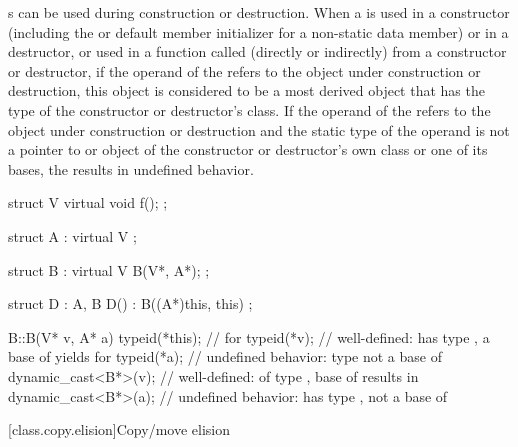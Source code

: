 \pnum
{}%
%
%
%
s can be used during construction
or destruction. When a
is used in a constructor (including the
 or default member initializer
for a non-static data member)
or in a destructor, or used in a function called (directly or indirectly) from
a constructor or destructor, if the operand of the
refers to the object under construction or destruction, this object is
considered to be a most derived object that has the type of the constructor or
destructor's class.
If the operand of the
refers to the object under construction or destruction and the static type of
the operand is not a pointer to or object of the constructor or destructor's
own class or one of its bases, the
results in undefined behavior.
\begin{example}
\begin{codeblock}
struct V {
  virtual void f();
};

struct A : virtual V { };

struct B : virtual V {
  B(V*, A*);
};

struct D : A, B {
  D() : B((A*)this, this) { }
};

B::B(V* v, A* a) {
  typeid(*this);                //  for 
  typeid(*v);                   // well-defined:  has type , a base of  yields  for 
  typeid(*a);                   // undefined behavior: type  not a base of 
  dynamic_cast<B*>(v);          // well-defined:  of type ,  base of  results in 
  dynamic_cast<B*>(a);          // undefined behavior:  has type ,  not a base of 
}
\end{codeblock}
\end{example}
%
%

[class.copy.elision]{Copy/move elision}%

